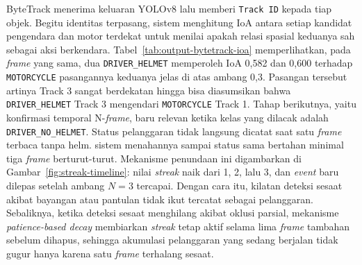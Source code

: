 ByteTrack menerima keluaran YOLOv8 lalu memberi \texttt{Track ID} kepada tiap objek. Begitu identitas terpasang, sistem menghitung IoA antara setiap kandidat pengendara dan motor terdekat untuk menilai apakah relasi spasial keduanya sah sebagai aksi berkendara. Tabel~\ref{tab:output-bytetrack-ioa} memperlihatkan, pada \textit{frame} yang sama, dua \texttt{DRIVER\_HELMET} memperoleh IoA 0,582 dan 0,600 terhadap \texttt{MOTORCYCLE} pasangannya  keduanya jelas di atas ambang 0,3. Pasangan tersebut artinya Track 3 sangat berdekatan hingga bisa diasumsikan bahwa \texttt{DRIVER\_HELMET} Track 3 mengendari \texttt{MOTORCYCLE} Track 1. Tahap berikutnya, yaitu konfirmasi temporal N-\textit{frame}, baru relevan ketika kelas yang dilacak adalah \texttt{DRIVER\_NO\_HELMET}. Status pelanggaran tidak langsung dicatat saat satu \textit{frame} terbaca tanpa helm. sistem menahannya sampai status sama bertahan minimal tiga \textit{frame} berturut-turut. Mekanisme penundaan ini digambarkan di Gambar~\ref{fig:streak-timeline}: nilai \textit{streak} naik dari 1, 2, lalu 3, dan \textit{event} baru dilepas setelah ambang $N=3$ tercapai. Dengan cara itu, kilatan deteksi sesaat akibat bayangan atau pantulan tidak ikut tercatat sebagai pelanggaran. Sebaliknya, ketika deteksi sesaat menghilang akibat oklusi parsial, mekanisme \textit{patience-based decay} membiarkan \textit{streak} tetap aktif selama lima \textit{frame} tambahan sebelum dihapus, sehingga akumulasi pelanggaran yang sedang berjalan tidak gugur hanya karena satu \textit{frame} terhalang sesaat.

\begin{table}[htbp]
\centering
\caption{Cuplikan keluaran ByteTrack dan nilai IoA pada \textit{frame} awal.}
\label{tab:output-bytetrack-ioa}
\small
{}
\end{table}


